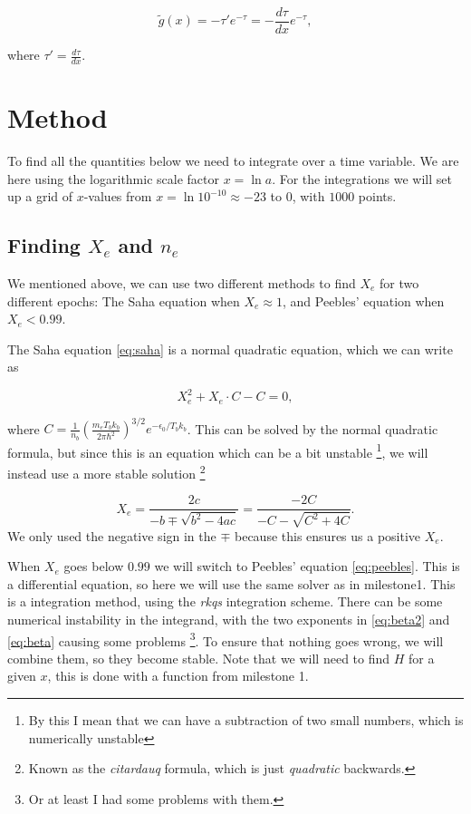 \documentclass[a4paper,norsk, 10pt]{article}
\begin{document}
\begin{equation}\label{eq:g}
\tilde{g} (x) = -\tau'e^{-\tau} = -\frac{d\tau}{dx}e^{-\tau},
\end{equation}

where $\tau' = \frac{d\tau}{dx}$.


\section{Method}
To find all the quantities below we need to integrate over a time variable. We are here using the logarithmic scale factor $x = \ln a$. For the integrations we will set up a grid of $x$-values from $x = \ln 10^{-10} \approx -23$ to $0$, with $1000$ points.

\subsection{Finding $X_e$ and $n_e$}
We mentioned above, we can use two different methods to find $X_e$ for two different epochs: The Saha equation when $X_e \approx 1$, and Peebles' equation when $X_e < 0.99$. 

The Saha equation \eqref{eq:saha} is a normal quadratic equation, which we can write as

\begin{equation}
X_e^2 + X_e\cdot C - C = 0,
\end{equation}

where $C = \frac{1}{n_b}\left(\frac{m_e T_b k_b}{2\pi \hbar^2}\right)^{3/2} e^{-\epsilon_0/T_b k_b}$. This can be solved by the normal quadratic formula, but since this is an equation which can be a bit unstable \footnote{By this I mean that we can have a subtraction of two small numbers, which is numerically unstable}, we will instead use a more stable solution \footnote{Known as the \textit{citardauq} formula, which is just \textit{quadratic} backwards.}

\begin{equation}
X_e = \frac{2c}{-b \mp \sqrt{b^2 - 4ac}} = \frac{-2C}{-C - \sqrt{C^2 + 4C}}.
\end{equation}
We only used the negative sign in the $\mp$ because this ensures us a positive $X_e$.

When $X_e$ goes below $0.99$ we will switch to Peebles' equation \eqref{eq:peebles}. This is a differential equation, so here we will use the same solver as in milestone1. This is a integration method, using the \textit{rkqs} integration scheme. There can be some numerical instability in the integrand, with the two exponents in \eqref{eq:beta2} and \eqref{eq:beta} causing some problems \footnote{Or at least I had some problems with them.}. To ensure that nothing goes wrong, we will combine them, so they become stable. Note that we will need to find $H$ for a given $x$, this is done with a function from milestone 1.
\end{document}
